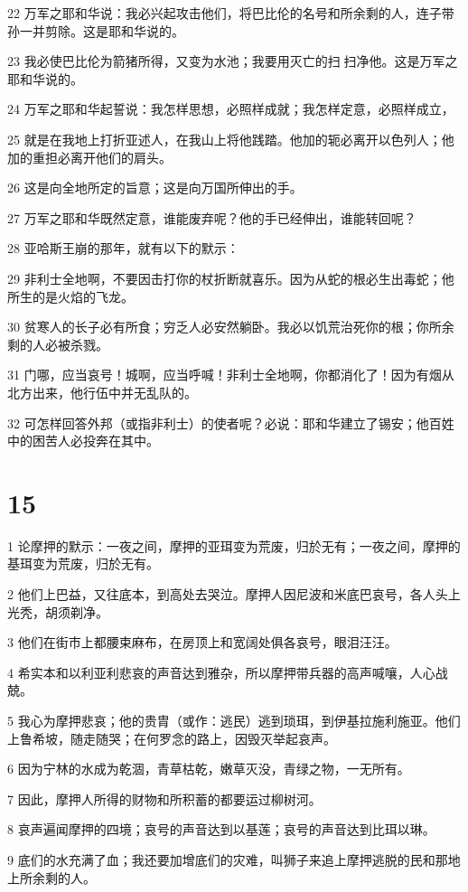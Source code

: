 \par 22 万军之耶和华说：我必兴起攻击他们，将巴比伦的名号和所余剩的人，连子带孙一并剪除。这是耶和华说的。
\par 23 我必使巴比伦为箭猪所得，又变为水池；我要用灭亡的扫扫净他。这是万军之耶和华说的。
\par 24 万军之耶和华起誓说：我怎样思想，必照样成就；我怎样定意，必照样成立，
\par 25 就是在我地上打折亚述人，在我山上将他践踏。他加的轭必离开以色列人；他加的重担必离开他们的肩头。
\par 26 这是向全地所定的旨意；这是向万国所伸出的手。
\par 27 万军之耶和华既然定意，谁能废弃呢？他的手已经伸出，谁能转回呢？
\par 28 亚哈斯王崩的那年，就有以下的默示：
\par 29 非利士全地啊，不要因击打你的杖折断就喜乐。因为从蛇的根必生出毒蛇；他所生的是火焰的飞龙。
\par 30 贫寒人的长子必有所食；穷乏人必安然躺卧。我必以饥荒治死你的根；你所余剩的人必被杀戮。
\par 31 门哪，应当哀号！城啊，应当呼喊！非利士全地啊，你都消化了！因为有烟从北方出来，他行伍中并无乱队的。
\par 32 可怎样回答外邦（或指非利士）的使者呢？必说：耶和华建立了锡安；他百姓中的困苦人必投奔在其中。

\chapter{15}

\par 1 论摩押的默示：一夜之间，摩押的亚珥变为荒废，归於无有；一夜之间，摩押的基珥变为荒废，归於无有。
\par 2 他们上巴益，又往底本，到高处去哭泣。摩押人因尼波和米底巴哀号，各人头上光秃，胡须剃净。
\par 3 他们在街市上都腰束麻布，在房顶上和宽阔处俱各哀号，眼泪汪汪。
\par 4 希实本和以利亚利悲哀的声音达到雅杂，所以摩押带兵器的高声喊嚷，人心战兢。
\par 5 我心为摩押悲哀；他的贵胄（或作：逃民）逃到琐珥，到伊基拉施利施亚。他们上鲁希坡，随走随哭；在何罗念的路上，因毁灭举起哀声。
\par 6 因为宁林的水成为乾涸，青草枯乾，嫩草灭没，青绿之物，一无所有。
\par 7 因此，摩押人所得的财物和所积蓄的都要运过柳树河。
\par 8 哀声遍闻摩押的四境；哀号的声音达到以基莲；哀号的声音达到比珥以琳。
\par 9 底们的水充满了血；我还要加增底们的灾难，叫狮子来追上摩押逃脱的民和那地上所余剩的人。

